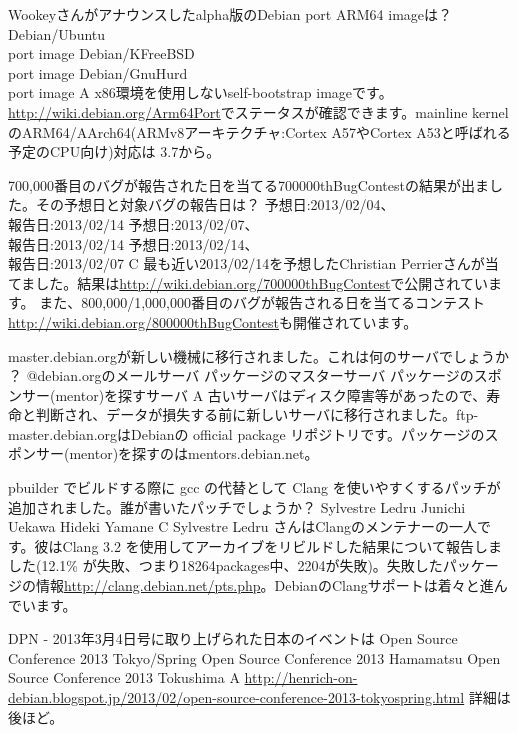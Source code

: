 \santaku
{Wookeyさんがアナウンスしたalpha版のDebian port ARM64 imageは？}
{Debian/Ubuntu \\port image}
{Debian/KFreeBSD \\port image}
{Debian/GnuHurd \\port image}
{A}
{x86環境を使用しないself-bootstrap imageです。\url{http://wiki.debian.org/Arm64Port}でステータスが確認できます。mainline kernelのARM64/AArch64(ARMv8アーキテクチャ:Cortex A57やCortex A53と呼ばれる予定のCPU向け)対応は 3.7から。}

\santaku
{700,000番目のバグが報告された日を当てる700000thBugContestの結果が出ました。その予想日と対象バグの報告日は？}
{予想日:2013/02/04、\\報告日:2013/02/14}
{予想日:2013/02/07、\\報告日:2013/02/14}
{予想日:2013/02/14、\\報告日:2013/02/07}
{C}
{最も近い2013/02/14を予想したChristian Perrierさんが当てました。結果は\url{http://wiki.debian.org/700000thBugContest}で公開されています。
また、800,000/1,000,000番目のバグが報告される日を当てるコンテスト\url{http://wiki.debian.org/800000thBugContest}も開催されています。}

\santaku
{master.debian.orgが新しい機械に移行されました。これは何のサーバでしょうか ？}
{@debian.orgのメールサーバ}
{パッケージのマスターサーバ}
{パッケージのスポンサー(mentor)を探すサーバ}
{A}
{古いサーバはディスク障害等があったので、寿命と判断され、データが損失する前に新しいサーバに移行されました。ftp-master.debian.orgはDebianの official package リポジトリです。パッケージのスポンサー(mentor)を探すのはmentors.debian.net。 }

\santaku
{pbuilder でビルドする際に gcc の代替として Clang を使いやすくするパッチが追加されました。誰が書いたパッチでしょうか？}
{Sylvestre Ledru}
{Junichi Uekawa}
{Hideki Yamane}
{C}
{Sylvestre Ledru さんはClangのメンテナーの一人です。彼はClang 3.2 を使用してアーカイブをリビルドした結果について報告しました(12.1\% が失敗、つまり18264packages中、2204が失敗)。失敗したパッケージの情報\url{http://clang.debian.net/pts.php}。DebianのClangサポートは着々と進んでいます。}

\santaku
{DPN - 2013年3月4日号に取り上げられた日本のイベントは}
{Open Source Conference 2013 Tokyo/Spring}
{Open Source Conference 2013 Hamamatsu}
{Open Source Conference 2013 Tokushima}
{A}
{\url{http://henrich-on-debian.blogspot.jp/2013/02/open-source-conference-2013-tokyospring.html} 詳細は後ほど。}

